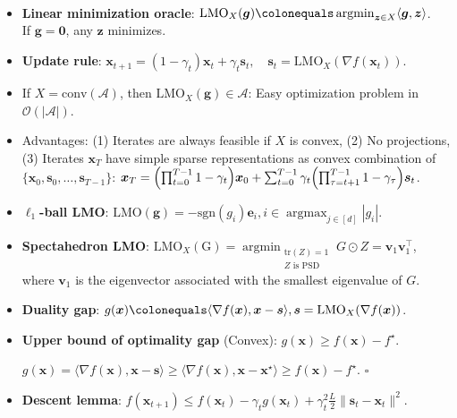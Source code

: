 \documentclass[8pt,a4paper]{extarticle}
\renewcommand{\proof}[1]{\begin{tcolorbox}#1 \hfill $\square$\end{tcolorbox}}
\DeclareMathOperator*{\argmax}{argmax}
\DeclareMathOperator*{\argmin}{argmin}
\newcommand{\lft}{\mathopen{}\mathclose\bgroup\left}
\newcommand{\rgt}{\aftergroup\egroup\right}
\renewcommand{\vec}[1]{\bm{#1}}
\newcommand{\mat}[1]{#1}
\newenvironment{topic}[1]
{\textbf{\sffamily \colorbox{black}{\rlap{\textbf{\textcolor{white}{#1}}}\hspace{\linewidth}\hspace{-2\fboxsep}}} \\ \vspace{0.2cm}}
{}
\begin{document}
\begin{multicols*}{2}
    \begin{topic}{Frank-Wolfe}
        \begin{itemize}
            \item \textbf{Linear minimization oracle}: $\mathrm{LMO}_X(\vec{g}) \colonequals \argmin_{\vec{z} \in X} \langle \vec{g}, \vec{z} \rangle$. \\
                  If $\vec{g} = \vec{0}$, any $\vec{z}$ minimizes.
            \item \textbf{Update rule}: $\vec{x}_{t+1} = (1-\gamma_t) \vec{x}_t + \gamma_t \vec{s}_t, \quad \vec{s}_t = \mathrm{LMO}_X(\nabla f(\vec{x}_t))$.
            \item If $X = \mathrm{conv}(\mathcal{A})$, then $\mathrm{LMO}_X(\vec{g}) \in \mathcal{A}$: Easy
                  optimization problem in $\mathcal{O}(|\mathcal{A}|)$.
            \item Advantages: (1) Iterates are always feasible if $X$ is convex, (2) No projections, (3) Iterates
                  $\vec{x}_T$ have simple sparse representations as convex combination of $\{ \vec{x}_0, \vec{s}_0,
                      \ldots, \vec{s}_{T-1} \}$: $\vec{x}_T = \lft( \prod_{t=0}^{T-1} 1-\gamma_t \rgt) \vec{x}_0 +
                      \sum_{t=0}^{T-1} \gamma_t \lft( \prod_{\tau=t+1}^{T-1} 1 - \gamma_\tau \rgt) \vec{s}_t$.
            \item \textbf{$\ell_1$-ball LMO}: $\mathrm{LMO}(\vec{g}) = -\mathrm{sgn}(g_i) \vec{e}_i, i \in \argmax_{j
                          \in [d]} |g_i|$.
            \item \textbf{Spectahedron LMO}: $\mathrm{LMO}_X(\mathrm{G}) = \argmin_{\substack{\mathrm{tr}(\mat{Z}) = 1 \\ \text{$Z$ is PSD}}} \mat{G} \odot \mat{Z} = \vec{v}_1 \vec{v}_1^\top$,
                  where $\vec{v}_1$ is the eigenvector associated with the smallest eigenvalue of $\mat{G}$.
            \item \textbf{Duality gap}: $g(\vec{x}) \colonequals \langle \nabla f(\vec{x}), \vec{x} - \vec{s} \rangle, \vec{s} = \mathrm{LMO}_X(\nabla f(\vec{x}))$.
            \item \textbf{Upper bound of optimality gap} (Convex): $g(\vec{x}) \geq f(\vec{x}) - f^\star$.
                  \proof{$g(\vec{x}) = \langle \nabla f(\vec{x}), \vec{x} - \vec{s} \rangle \geq \langle \nabla f(\vec{x}), \vec{x} - \vec{x}^\star \rangle \geq f(\vec{x}) - f^\star$.}
            \item \textbf{Descent lemma}: $f(\vec{x}_{t+1}) \leq f(\vec{x}_t) - \gamma_t g(\vec{x}_t) + \gamma_t^2 \frac{L}{2} \| \vec{s}_t - \vec{x}_t \|^2$.

\end{itemize}
\end{topic}
\end{multicols*}
\end{document}
